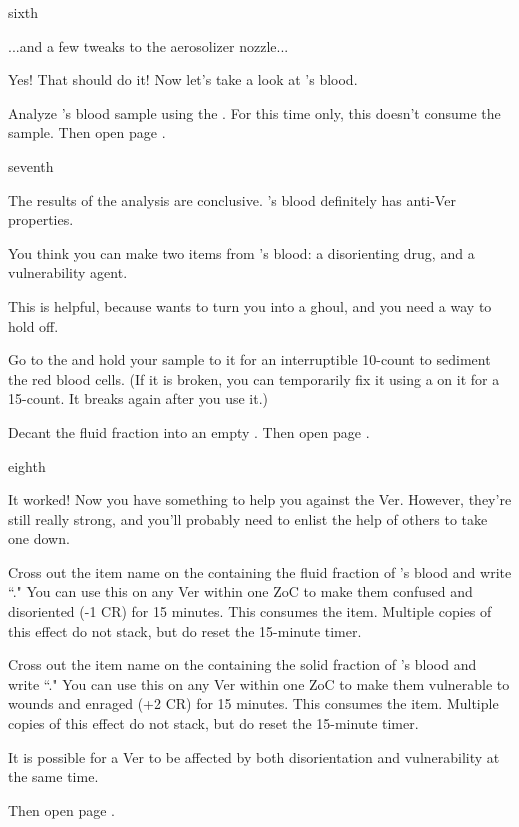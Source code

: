\documentclass[greennotebook]{guildcamp4} %
\begin{document}
\begin{page}{sixth}

...and a few tweaks to the aerosolizer nozzle...

Yes! That should do it! Now let's take a look at \cPlead{}'s blood.

Analyze \cPlead{}'s blood sample using the \sBloodAnalyzer{}. For this time only, this doesn't consume the sample. Then open page .

\end{page}

\begin{page}{seventh}

The results of the analysis are conclusive. \cPlead{}'s blood definitely has anti-Ver properties. 

You think you can make two items from \cPlead{}'s blood: a disorienting drug, and a vulnerability agent. 

This is helpful, because \cVone{} wants to turn you into a ghoul, and you need a way to hold \cVone{\them} off.

Go to the \sCentrifuge{} and hold your sample to it for an interruptible 10-count to sediment the red blood cells. (If it is broken, you can temporarily fix it using a \iWrench{} on it for a 15-count. It breaks again after you use it.)

Decant the fluid fraction into an empty \iTestTube{}. Then open page .

\end{page}

\begin{page}{eighth}

It worked! Now you have something to help you against the Ver. However, they're still really strong, and you'll probably need to enlist the help of others to take one down.

Cross out the item name on the \iTestTube{} containing the fluid fraction of \cPlead{}'s blood and write ``\iVerDisorientationDrug{}." You can use this on any Ver within one ZoC to make them confused and disoriented (-1 CR) for 15 minutes. This consumes the item. Multiple copies of this effect do not stack, but do reset the 15-minute timer.

Cross out the item name on the \iTestTube{} containing the solid fraction of \cPlead{}'s blood and write ``\iVerVulnerabilityDrug{}." You can use this on any Ver within one ZoC to make them vulnerable to wounds and enraged (+2 CR) for 15 minutes. This consumes the item. Multiple copies of this effect do not stack, but do reset the 15-minute timer.

It is possible for a Ver to be affected by both disorientation and vulnerability at the same time.

Then open page .

\end{page}
\end{document}
